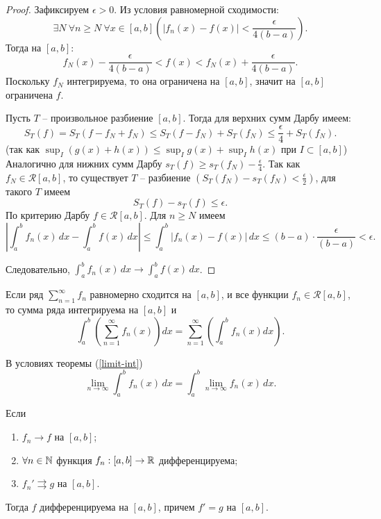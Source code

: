 \begin{proof}
    Зафиксируем $\epsilon > 0$. Из условия равномерной сходимости:
    \[\exists N \ \forall n \geq N \ \forall x \in [a, b] \left(|f_{n}(x) - f(x)| < \frac{\epsilon}{4(b - a)}\right).\]
    Тогда на $[a, b]$:
    \[f_{N}(x) - \frac{\epsilon}{4(b - a)} < f(x) < f_{N}(x) + \frac{\epsilon}{4(b - a)}.\]
    Поскольку $f_{N}$ интегрируема, то она ограничена на $[a, b]$, значит на $[a, b]$ ограничена $f$.

    Пусть $T$ -- произвольное разбиение $[a, b]$. Тогда для верхних сумм Дарбу имеем:
    \[S_{T}(f) = S_{T}(f - f_{N} + f_{N}) \leq S_{T}(f - f_{N}) + S_{T}(f_{N}) \leq \frac{\epsilon}{4} + S_{T}(f_{N}).\]
    (так как $\sup_I \left(g(x) + h(x)\right) \le \sup_I g(x) + \sup_I h(x)$ при $I \subset [a, b]$)\\
    Аналогично для нижних сумм Дарбу $s_{T}(f) \geq s_{T}(f_{N}) - \frac{\epsilon}{4}$.
    Так как $f_{N} \in \mathcal{R}[a, b]$, то существует $T$ -- разбиение $\left(S_T(f_N) - s_T(f_N) < \frac{\epsilon}{2}\right)$, для такого $T$ имеем 
    \[S_T(f) - s_T(f) \le \epsilon.\]
    По критерию Дарбу $f \in \mathcal{R}[a, b]$.
    Для $n \ge N$ имеем
    \[
        \left|\int_a^b f_n(x)\, dx - \int_a^b f(x)\, dx\right| \le \int_a^b |f_n(x) - f(x)|\, dx \le (b - a) \cdot \frac{\epsilon}{(b - a)} < \epsilon.
    \]

    Следовательно, $\int_a^b f_n(x)\, dx \rightarrow \int_a^b f(x)\, dx$.
\end{proof}

\begin{corollary}
    Если ряд $\sum_{n = 1}^{\infty}f_{n}$ равномерно сходится на $[a, b]$, и все функции $f_{n} \in \mathcal{R}[a, b]$, то сумма ряда интегрируема на $[a, b]$ и 
    \[\int_{a}^{b}\left(\sum_{n = 1}^{\infty} f_{n}(x)\right)dx = \sum_{n = 1}^{\infty}\left(\int_{a}^{b} f_{n}(x)dx\right).\]
\end{corollary}

\begin{note}
    В условиях теоремы (\ref{limit-int})
    \[\lim_{n \rightarrow \infty} \int_a^b f_n(x)\, dx = \int_a^b \lim_{n \rightarrow \infty} f_n(x)\, dx.\]
\end{note}

\begin{theorem}
    \label{covergence-3.4}
    Если
    \begin{enumerate}
        \item $f_{n} \to f$ на $[a, b]$;
        \item $\forall n \in \mathbb{N}$ функция $f_{n}: [a, b] \to \mathbb{R}$ дифференцируема;
        \item $f_{n}' \rightrightarrows g$ на $[a, b]$.
    \end{enumerate}
    Тогда $f$ дифференцируема на $[a, b]$, причем $f' = g$ на $[a, b]$.
\end{theorem}

